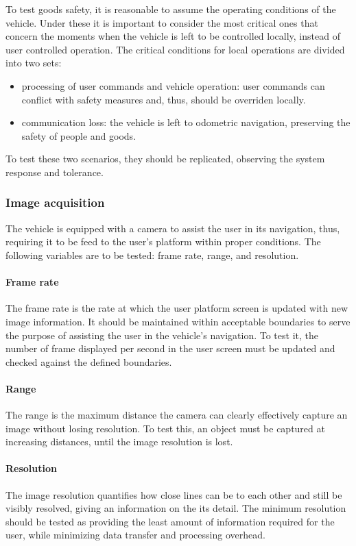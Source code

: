 To test goods safety, it is reasonable to assume the operating conditions of the
vehicle. Under these it is important to consider the most critical ones that
concern the moments when the vehicle is left to be controlled locally, instead
of user controlled operation. The critical conditions for local operations are
divided into two sets:
\begin{itemize}
\item processing of user commands and vehicle operation: user commands can
  conflict with safety measures and, thus, should be overriden locally.
\item communication loss: the vehicle is left to odometric navigation,
  preserving the safety of people and goods.
\end{itemize}
To test these two scenarios, they should be replicated, observing the system
response and tolerance.%

\subsubsection{Image acquisition}%
\label{sec:orgb1f5c2a}
The vehicle is equipped with a camera to assist the user in its navigation,
thus, requiring it to be feed to the user's platform within proper conditions.
The following variables are to be tested: frame rate, range, and resolution.

\paragraph{Frame rate}%
\label{sec:frame-rate-test}
The frame rate is the rate at which the user platform screen is updated with new
image information. It should be maintained within acceptable boundaries to serve
the purpose of assisting the user in the vehicle's navigation. To test it, the
number of frame displayed per second in the user screen must be updated and
checked against the defined boundaries.

\paragraph{Range}%
\label{sec:range-test}
The range is the maximum distance the camera can clearly effectively capture an
image without losing resolution. To test this, an object must be captured at
increasing distances, until the image resolution is lost.

\paragraph{Resolution}%
\label{sec:resolution-test}
The image resolution quantifies how close lines can be to each other and still
be visibly resolved, giving an information on the its detail. The minimum
resolution should be tested as providing the least amount of information
required for the user, while minimizing data transfer and processing overhead.

